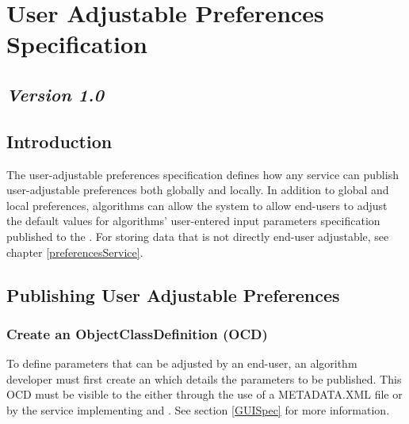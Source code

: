 %

\section{User Adjustable Preferences Specification}
\label{userPrefsSpec}
\subsection*{\textit{Version 1.0}}
\subsection{Introduction}

The user-adjustable preferences specification defines how any service can publish
user-adjustable preferences both globally and locally. In addition to global and
local preferences, algorithms can allow the system to allow end-users to adjust
the default values for algorithms' user-entered input parameters specification
published to the . For storing data that is not directly
end-user adjustable, see chapter \ref{preferencesService}.

\subsection{Publishing User Adjustable Preferences}

\subsubsection*{Create an ObjectClassDefinition (OCD)} To define parameters that
can be adjusted by an end-user, an algorithm developer must first create an
 which details the parameters to be published. This
OCD must be visible to the  either through the use of a
METADATA.XML file or by the service implementing  and
. See section \ref{GUISpec} for more information.

